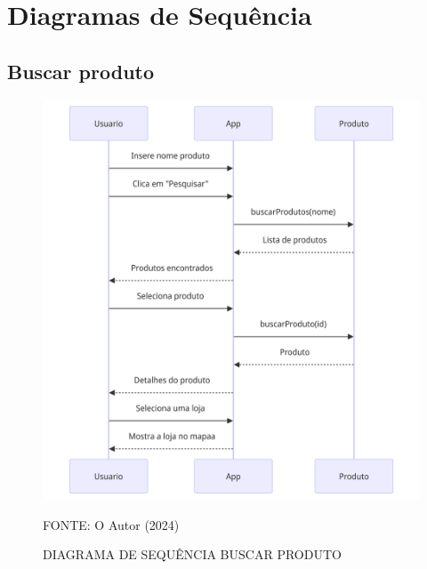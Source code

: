 \chapter{Diagramas de Sequência} \label{cha:diagramassequencia}



\section{Buscar produto}
\begin{figure}[H]
    \caption{\label{fig:label} DIAGRAMA DE SEQUÊNCIA BUSCAR PRODUTO}
    \includegraphics[width = 150mm]{fig/sequencia/sequencia1.png}
    \footnotesize \centering
    \par FONTE: O Autor (2024)
\end{figure}

